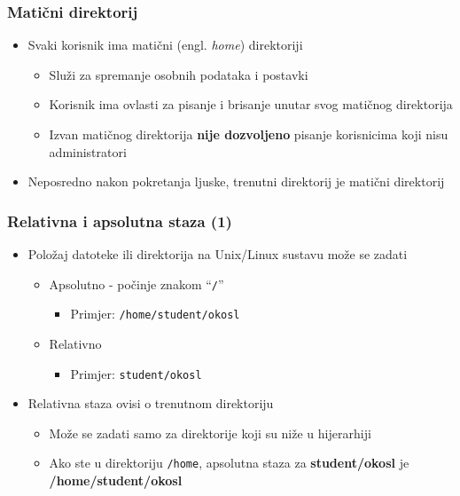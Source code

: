 \documentclass{beamer}
\newcommand{\shell}[1]{\texttt{#1}}
\begin{document}
\begin{frame}[t]
\frametitle{Matični direktorij}
\begin{itemize}
  \item Svaki korisnik ima matični (engl. \emph{home}) direktoriji
  \begin{itemize}
    \item Služi za spremanje osobnih podataka i postavki
    \item Korisnik ima ovlasti za pisanje i brisanje unutar svog matičnog
          direktorija
    \item Izvan matičnog direktorija \textbf{nije dozvoljeno} pisanje 
          korisnicima koji nisu administratori
  \end{itemize}
  \item Neposredno nakon pokretanja ljuske, trenutni direktorij je matični
        direktorij 
\end{itemize}
\end{frame}

\begin{frame}[t]
\frametitle{Relativna i apsolutna staza (1)}
\begin{itemize}
  \item Položaj datoteke ili direktorija na Unix/Linux sustavu može se 
        zadati
  \begin{itemize}
    \item Apsolutno - počinje znakom ``\texttt{/}''
    \begin{itemize}
      \item[] Primjer: \texttt{/home/student/okosl}
    \end{itemize}
    \item Relativno 
    \begin{itemize}
      \item[] Primjer: \texttt{student/okosl}
    \end{itemize}
  \end{itemize}

  \item Relativna staza ovisi o trenutnom direktoriju
  \begin{itemize}
    \item Može se zadati samo za direktorije koji su niže u hijerarhiji
    \item Ako ste u direktoriju \shell{/home}, apsolutna staza za
          \textbf{student/okosl} je \textbf{/home/student/okosl}
  \end{itemize}
\end{itemize}
\end{frame}
\end{document}
